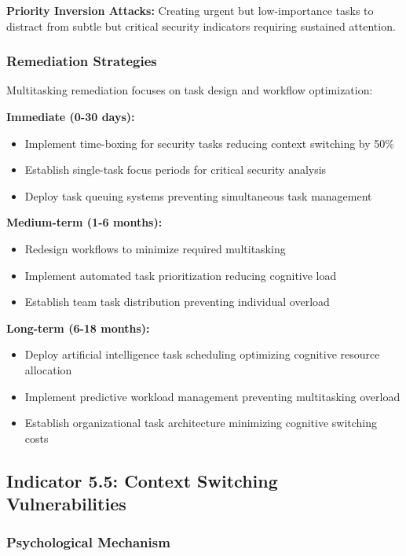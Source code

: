 \documentclass[11pt,a4paper]{article}
\begin{document}
\textbf{Priority Inversion Attacks:} Creating urgent but low-importance tasks to distract from subtle but critical security indicators requiring sustained attention.

\subsubsection{Remediation Strategies}

Multitasking remediation focuses on task design and workflow optimization:

\textbf{Immediate (0-30 days):}
\begin{itemize}
\item Implement time-boxing for security tasks reducing context switching by 50\%
\item Establish single-task focus periods for critical security analysis
\item Deploy task queuing systems preventing simultaneous task management
\end{itemize}

\textbf{Medium-term (1-6 months):}
\begin{itemize}
\item Redesign workflows to minimize required multitasking
\item Implement automated task prioritization reducing cognitive load
\item Establish team task distribution preventing individual overload
\end{itemize}

\textbf{Long-term (6-18 months):}
\begin{itemize}
\item Deploy artificial intelligence task scheduling optimizing cognitive resource allocation
\item Implement predictive workload management preventing multitasking overload
\item Establish organizational task architecture minimizing cognitive switching costs
\end{itemize}

\subsection{Indicator 5.5: Context Switching Vulnerabilities}

\subsubsection{Psychological Mechanism}
\end{document}
